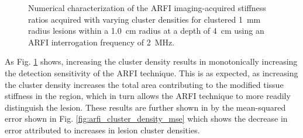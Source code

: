 			\begin{figure}[!htb]
				\centering
				\caption[Numerical characterization of ARFI imaging-acquired stiffness ratio with clustered lesions]{Numerical characterization of the ARFI imaging-acquired stiffness ratios acquired with varying cluster densities for clustered \SI{1}{\mm} radius lesions within a \SI{1.0}{cm} radius at a depth of \SI{4}{\cm} using an ARFI interrogation frequency of \SI{2}{\MHz}.}
				\label{fig:arfi_cluster_density}
			\end{figure}

			As Fig. \ref{fig:arfi_cluster_density} shows, increasing the cluster density results in monotonically increasing the detection sensitivity of the ARFI technique. This is as expected, as increasing the cluster density increases the total area contributing to the modified tissue stiffness in the region, which in turn allows the ARFI technique to more readily distinguish the lesion. These results are further shown in by the mean-squared error shown in Fig. \ref{fig:arfi_cluster_density_mse} which shows the decrease in error attributed to increases in lesion cluster densities.

